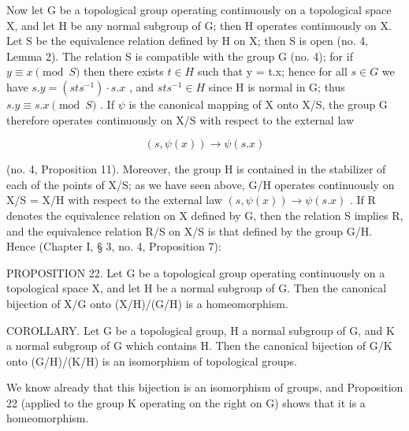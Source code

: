 Now let G be a topological group operating continuously on a topological space X, and let H be any normal subgroup of G; then H operates continuously on X. Let S be the equivalence relation defined by H on X; then S is open (no. 4, Lemma 2). The relation S is compatible with the group G (no. 4); for if \(y \equiv x \pmod{S}\) then there exists \(t \in H\) such that y = t.x; hence for all \(s \in G\) we have \(s.y = (sts^{-1}) \cdot s.x\) , and \(sts^{-1} \in H\) since H is normal in G; thus \(s.y \equiv s.x \pmod{S}\) . If \(\psi\) is the canonical mapping of X onto X/S, the group G therefore operates continuously on X/S with respect to the external law

\[
(s, \psi (x)) \rightarrow \psi (s. x)
\]

(no. 4, Proposition 11). Moreover, the group H is contained in the stabilizer of each of the points of X/S; as we have seen above, G/H operates continuously on X/S = X/H with respect to the external law \((s, \psi(x)) \to \psi(s.x)\) . If R denotes the equivalence relation on X defined by G, then the relation S implies R, and the equivalence relation R/S on X/S is that defined by the group G/H. Hence (Chapter I, § 3, no. 4, Proposition 7):

PROPOSITION 22. Let G be a topological group operating continuously on a topological space X, and let H be a normal subgroup of G. Then the canonical bijection of X/G onto (X/H)/(G/H) is a homeomorphism.

COROLLARY. Let G be a topological group, H a normal subgroup of G, and K a normal subgroup of G which contains H. Then the canonical bijection of G/K onto (G/H)/(K/H) is an isomorphism of topological groups.

We know already that this bijection is an isomorphism of groups, and Proposition 22 (applied to the group K operating on the right on G) shows that it is a homeomorphism.

